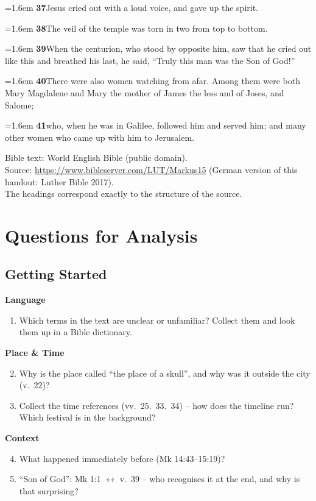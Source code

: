 \documentclass[12pt,a4paper]{article}
\newcommand{\vers}[2]{%
  \par\hangindent=1.6em\hangafter=1
  \textbf{#1}\enspace #2\par}
\begin{document}
\vers{37}{Jesus cried out with a loud voice, and gave up the spirit.}
\vers{38}{The veil of the temple was torn in two from top to bottom.}
\vers{39}{When the centurion, who stood by opposite him, saw that he cried out like this and breathed his last, he said, ``Truly this man was the Son of God!''}
\vers{40}{There were also women watching from afar. Among them were both Mary Magdalene and Mary the mother of James the less and of Joses, and Salome;}
\vers{41}{who, when he was in Galilee, followed him and served him; and many other women who came up with him to Jerusalem.}

\vspace{1em}
{\footnotesize Bible text: World English Bible (public domain).\\
Source: \url{https://www.bibleserver.com/LUT/Markus15} (German version of this handout: Luther Bible 2017).\\
The headings correspond exactly to the structure of the source.}

\vspace{1.5em}

\newpage

\section*{Questions for Analysis}

\subsection*{Getting Started}

\textbf{Language}
\begin{enumerate}
  \item Which terms in the text are unclear or unfamiliar? Collect them and look them up in a Bible dictionary.
\end{enumerate}

\textbf{Place \& Time}
\begin{enumerate}\setcounter{enumi}{1}
  \item Why is the place called ``the place of a skull'', and why was it outside the city (v.~22)?
  \item Collect the time references (vv.~25.~33.~34) -- how does the timeline run? Which festival is in the background?
\end{enumerate}

\textbf{Context}
\begin{enumerate}\setcounter{enumi}{3}
  \item What happened immediately before (Mk 14:43--15:19)?
  \item ``Son of God'': Mk 1:1 $\leftrightarrow$ v.~39 -- who recognises it at the end, and why is that surprising?
\end{enumerate}
\end{document}
